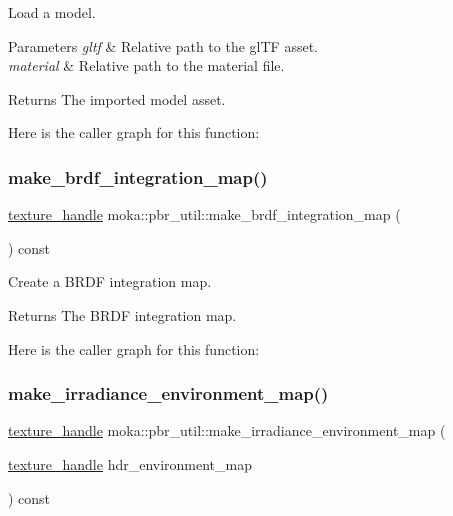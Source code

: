 Load a model. 


\begin{DoxyParams}{Parameters}
{\em gltf} & Relative path to the gl\+TF asset. \\
\hline
{\em material} & Relative path to the material file. \\
\hline
\end{DoxyParams}
\begin{DoxyReturn}{Returns}
The imported model asset. 
\end{DoxyReturn}
Here is the caller graph for this function\+:
\mbox{\label{classmoka_1_1pbr__util_a89ff10257ac7d9cce23c2a3c44aaae4c}} 
\subsubsection{\texorpdfstring{make\_brdf\_integration\_map()}{make\_brdf\_integration\_map()}}
{\footnotesize\ttfamily \mbox{\hyperlink{structmoka_1_1texture__handle}{texture\+\_\+handle}} moka\+::pbr\+\_\+util\+::make\+\_\+brdf\+\_\+integration\+\_\+map (\begin{DoxyParamCaption}{ }\end{DoxyParamCaption}) const}



Create a B\+R\+DF integration map. 

\begin{DoxyReturn}{Returns}
The B\+R\+DF integration map. 
\end{DoxyReturn}
Here is the caller graph for this function\+:
\mbox{\label{classmoka_1_1pbr__util_adec38254baf03a15c7c93ac871eac05e}} 
\subsubsection{\texorpdfstring{make\_irradiance\_environment\_map()}{make\_irradiance\_environment\_map()}}
{\footnotesize\ttfamily \mbox{\hyperlink{structmoka_1_1texture__handle}{texture\+\_\+handle}} moka\+::pbr\+\_\+util\+::make\+\_\+irradiance\+\_\+environment\+\_\+map (\begin{DoxyParamCaption}\item[{\mbox{\hyperlink{structmoka_1_1texture__handle}{texture\+\_\+handle}}}]{hdr\+\_\+environment\+\_\+map }\end{DoxyParamCaption}) const}



